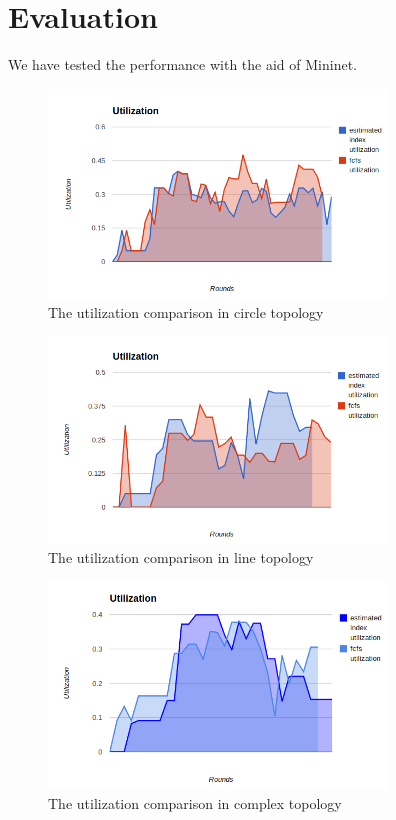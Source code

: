 \documentclass[a4paper,11pt,twocolumn]{article}
\begin{document}
\section{Evaluation}
We have tested the performance with the aid of Mininet\cite{mininet}. 
\begin{figure}[ht!]
\centering
\includegraphics[width=90mm]{circle_utilization.png}
\caption{The utilization comparison in circle topology}
\label{overflow}
\end{figure}

\begin{figure}[ht!]
\centering
\includegraphics[width=90mm]{line_utilization.png}
\caption{The utilization comparison in line topology}
\label{overflow}
\end{figure}

\begin{figure}[ht!]
\centering
\includegraphics[width=90mm]{mytopo_utilization.png}
\caption{The utilization comparison in complex topology}
\label{overflow}
\end{figure}
\end{document}
